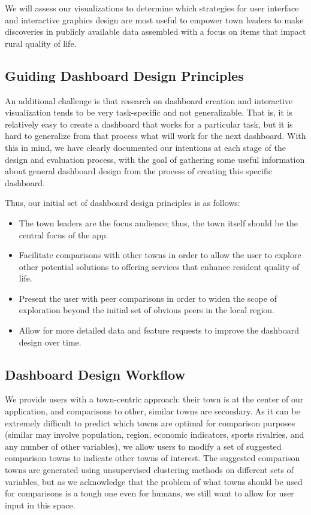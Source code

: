 \documentclass[letterpaper,inpress]{jdsart}
\begin{document}
We will assess our visualizations to determine which strategies for user interface and interactive graphics design are most useful to empower town leaders to make discoveries in publicly available data assembled with a focus on items that impact rural quality of life.

\subsection{Guiding Dashboard Design Principles}

An additional challenge is that research on dashboard creation and interactive visualization tends to be very task-specific and not generalizable. That is, it is relatively easy to create a dashboard that works for a particular task, but it is hard to generalize from that process what will work for the next dashboard. With this in mind, we have clearly documented our intentions at each stage of the design and evaluation process, with the goal of gathering some useful information about general dashboard design from the process of creating this specific dashboard.

Thus, our initial set of dashboard design principles is as follows:

\begin{itemize}
\item The town leaders are the focus audience; thus, the town itself should be the central focus of the app.
\item Facilitate comparisons with other towns in order to allow the user to explore other potential solutions to offering services that enhance resident quality of life.
\item Present the user with peer comparisons in order to widen the scope of exploration beyond the initial set of obvious peers in the local region.
\item Allow for more detailed data and feature requests to improve the dashboard design over time.
\end{itemize}

\subsection{Dashboard Design Workflow}

We provide users with a town-centric approach: their town is at the center of our application, and comparisons to other, similar towns are secondary. As it can be extremely difficult to predict which towns are optimal for comparison purposes (similar may involve population, region, economic indicators, sports rivalries, and any number of other variables), we allow users to modify a set of suggested comparison towns to indicate other towns of interest. The suggested comparison towns are generated using unsupervised clustering methods on different sets of variables, but as we acknowledge that the problem of what towns should be used for comparisons is a tough one even for humans, we still want to allow for user input in this space.
\end{document}
